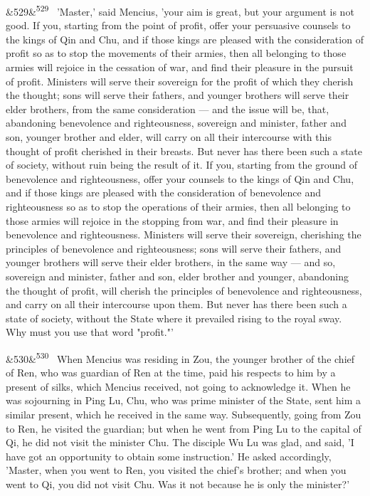 \documentclass[12pt]{article}
\newcommand{\para}[1][]{\par\noindent\ifx&#1&\else\textsuperscript{\footnotesize #1}~\fi}
\begin{document}
\para[529] 'Master,' said Mencius, 'your aim is great, but your argument is not good. If you, starting from the point of profit, offer your persuasive counsels to the kings of Qin and Chu, and if those kings are pleased with the consideration of profit so as to stop the movements of their armies, then all belonging to those armies will rejoice in the cessation of war, and find their pleasure in the pursuit of profit. Ministers will serve their sovereign for the profit of which they cherish the thought; sons will serve their fathers, and younger brothers will serve their elder brothers, from the same consideration --- and the issue will be, that, abandoning benevolence and righteousness, sovereign and minister, father and son, younger brother and elder, will carry on all their intercourse with this thought of profit cherished in their breasts. But never has there been such a state of society, without ruin being the result of it. If you, starting from the ground of benevolence and righteousness, offer your counsels to the kings of Qin and Chu, and if those kings are pleased with the consideration of benevolence and righteousness so as to stop the operations of their armies, then all belonging to those armies will rejoice in the stopping from war, and find their pleasure in benevolence and righteousness. Ministers will serve their sovereign, cherishing the principles of benevolence and righteousness; sons will serve their fathers, and younger brothers will serve their elder brothers, in the same way --- and so, sovereign and minister, father and son, elder brother and younger, abandoning the thought of profit, will cherish the principles of benevolence and righteousness, and carry on all their intercourse upon them. But never has there been such a state of society, without the State where it prevailed rising to the royal sway. Why must you use that word "profit."'

\para[530] When Mencius was residing in Zou, the younger brother of the chief of Ren, who was guardian of Ren at the time, paid his respects to him by a present of silks, which Mencius received, not going to acknowledge it. When he was sojourning in Ping Lu, Chu, who was prime minister of the State, sent him a similar present, which he received in the same way. Subsequently, going from Zou to Ren, he visited the guardian; but when he went from Ping Lu to the capital of Qi, he did not visit the minister Chu. The disciple Wu Lu was glad, and said, 'I have got an opportunity to obtain some instruction.' He asked accordingly, 'Master, when you went to Ren, you visited the chief's brother; and when you went to Qi, you did not visit Chu. Was it not because he is only the minister?'
\end{document}
